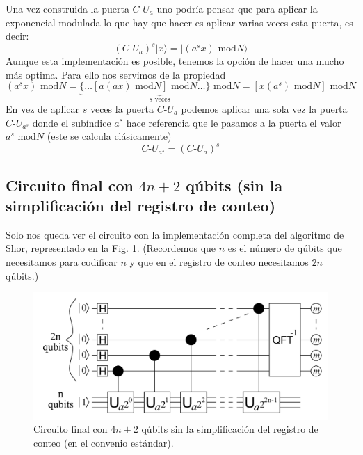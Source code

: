 \documentclass[a4paper,11pt]{book} %
\numberwithin{equation}{chapter}
\begin{document}
Una vez construida la puerta $C\text{-}U_{a}$ uno podría pensar que para aplicar la exponencial modulada lo que hay que hacer es aplicar varias veces esta puerta, es decir:
	\begin{equation}
	\left( C\text{-}U_a \right)^s  | x \rangle  = |(a^s x) \text{ mod} N \rangle
	\end{equation}
Aunque esta implementación es posible, tenemos la opción de hacer una mucho más optima. Para ello nos servimos de la propiedad 
	\begin{equation}
	(a^s x) \text{ mod} N = \underbrace{\{ \dots [a(ax) \text{ mod}N] \text{ mod}N \dots \}\text{ mod}{N}}_{s \text{ veces}} = [x (a^s)\text{ mod}N ] \text{ mod}N
	\end{equation}
En vez de aplicar $s$ veces la puerta $C\text{-}U_{a}$ podemos aplicar una sola vez la puerta $C\text{-}U_{a^s}$ donde el subíndice $a^s$ hace referencia que le pasamos a la puerta el valor $a^s \text{ mod} N$ (este se calcula clásicamente)
	\begin{equation}
	C\text{-}U_{a^{s}} = (C\text{-}U_{a})^s
	\end{equation}

\subsection{Circuito final con $4n+2$ qúbits (sin la simplificación del registro de conteo)}\label{sec_2n+3-Circuito-final-no-simplificacion}

Solo nos queda ver el circuito con la implementación completa del algoritmo de Shor, representado en la Fig. \ref{Fig_idea_circ_final_no_simpli}. (Recordemos que $n$ es el número de qúbits que necesitamos para codificar $n$ y que en el registro de conteo necesitamos $2n$ qúbits.)

\begin{figure}[H]
\centering 
\includegraphics[width=0.8\linewidth]{Figuras/Fig-Circuito-paper.png}
\caption{Circuito final con $4n+2$ qúbits sin la simplificación del registro de conteo (en el convenio estándar). }
\label{Fig_idea_circ_final_no_simpli}
\end{figure}
\end{document}

